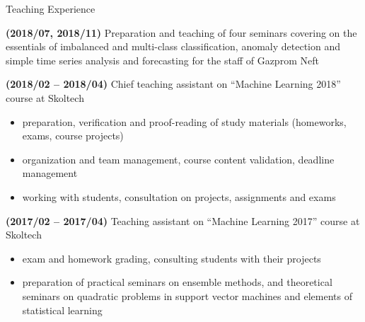 \documentclass{resume} %
\begin{document}
\begin{rSection}{Teaching Experience}
    \item \textbf{(2018/07, 2018/11)} %
    Preparation and teaching of four seminars covering on the essentials of imbalanced and multi-class classification, anomaly detection and simple time series analysis and forecasting for the staff of Gazprom Neft

    \item \textbf{(2018/02 -- 2018/04)}
    Chief teaching assistant on ``Machine Learning 2018'' course at Skoltech
    \begin{itemize}
        \item preparation, verification and proof-reading of study materials (homeworks, exams, course projects)
        
        \item organization and team management, course content validation, deadline management
        
        \item working with students, consultation on projects, assignments and exams
    \end{itemize}

    \item \textbf{(2017/02 -- 2017/04)}
    Teaching assistant on ``Machine Learning 2017'' course at Skoltech
    \begin{itemize}
        \item exam and homework grading, consulting students with their projects

        \item preparation of practical seminars on ensemble methods, and theoretical seminars on quadratic problems in support vector machines and elements of statistical learning
    \end{itemize}
\end{rSection}
\end{document}
